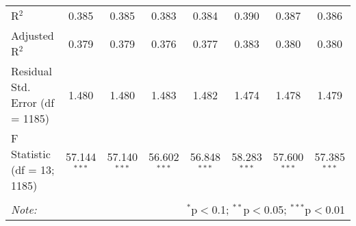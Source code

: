 \begin{table}[!htbp]
\begin{tabular}{@{\extracolsep{5pt}}lccccccc}
R$^{2}$ & 0.385 & 0.385 & 0.383 & 0.384 & 0.390 & 0.387 & 0.386 \\ 
Adjusted R$^{2}$ & 0.379 & 0.379 & 0.376 & 0.377 & 0.383 & 0.380 & 0.380 \\ 
Residual Std. Error (df = 1185) & 1.480 & 1.480 & 1.483 & 1.482 & 1.474 & 1.478 & 1.479 \\ 
F Statistic (df = 13; 1185) & 57.144$^{***}$ & 57.140$^{***}$ & 56.602$^{***}$ & 56.848$^{***}$ & 58.283$^{***}$ & 57.600$^{***}$ & 57.385$^{***}$ \\ 
\hline 
\hline \\[-1.8ex] 
\textit{Note:}  & \multicolumn{7}{r}{$^{*}$p$<$0.1; $^{**}$p$<$0.05; $^{***}$p$<$0.01} \\ 
\end{tabular} 
\end{table} 
